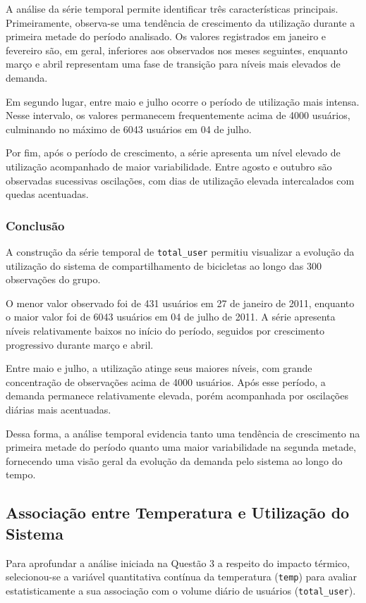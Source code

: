 \documentclass[12pt,a4paper]{article}
\begin{document}
A análise da série temporal permite identificar três características principais.
Primeiramente, observa-se uma tendência de crescimento da utilização durante a
primeira metade do período analisado. Os valores registrados em janeiro e
fevereiro são, em geral, inferiores aos observados nos meses seguintes, enquanto
março e abril representam uma fase de transição para níveis mais elevados de
demanda.

Em segundo lugar, entre maio e julho ocorre o período de utilização mais intensa.
Nesse intervalo, os valores permanecem frequentemente acima de 4000 usuários,
culminando no máximo de 6043 usuários em 04 de julho.

Por fim, após o período de crescimento, a série apresenta um nível elevado de
utilização acompanhado de maior variabilidade. Entre agosto e outubro são
observadas sucessivas oscilações, com dias de utilização elevada intercalados
com quedas acentuadas.

\subsubsection{Conclusão}

A construção da série temporal de \texttt{total\_user} permitiu visualizar a
evolução da utilização do sistema de compartilhamento de bicicletas ao longo das
300 observações do grupo.

O menor valor observado foi de 431 usuários em 27 de janeiro de 2011, enquanto
o maior valor foi de 6043 usuários em 04 de julho de 2011. A série apresenta
níveis relativamente baixos no início do período, seguidos por crescimento
progressivo durante março e abril.

Entre maio e julho, a utilização atinge seus maiores níveis, com grande
concentração de observações acima de 4000 usuários. Após esse período, a demanda
permanece relativamente elevada, porém acompanhada por oscilações diárias mais
acentuadas.

Dessa forma, a análise temporal evidencia tanto uma tendência de crescimento na
primeira metade do período quanto uma maior variabilidade na segunda metade,
fornecendo uma visão geral da evolução da demanda pelo sistema ao longo do tempo.

\subsection{Associação entre Temperatura e Utilização do Sistema}

Para aprofundar a análise iniciada na Questão 3 a respeito do impacto térmico, selecionou-se a variável quantitativa contínua da temperatura (\texttt{temp}) para avaliar estatisticamente a sua associação com o volume diário de usuários (\texttt{total\_user}).
\end{document}
